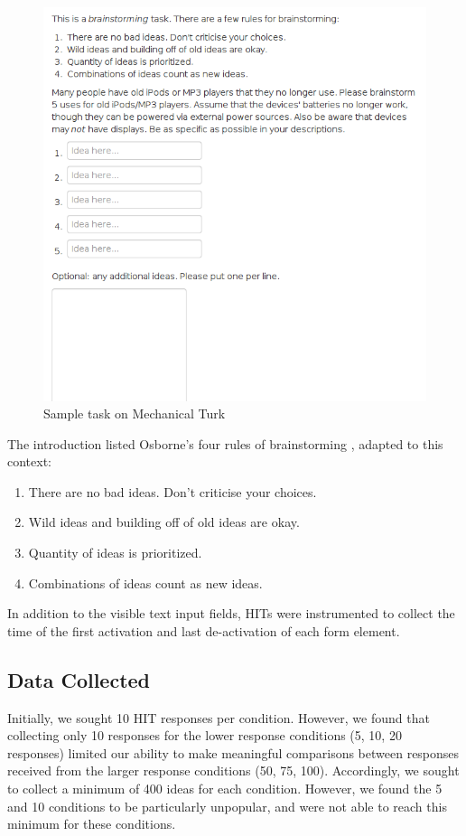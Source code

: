 \begin{figure}[h!]
    \centering
    \includegraphics[width=0.9\columnwidth]{sample_task}
    \caption{Sample task on Mechanical Turk}
    \label{fig:sample_task}
\end{figure}

The introduction listed Osborne's four rules of brainstorming \cite{osborn_applied_1957}, adapted to this context:

\begin{enumerate}
\item There are no bad ideas. Don't criticise your choices.
\item Wild ideas and building off of old ideas are okay.
\item Quantity of ideas is prioritized.
\item Combinations of ideas count as new ideas.
\end{enumerate}

In addition to the visible text input fields, HITs were instrumented to collect the time of the first activation and last de-activation of each form element.

\subsection{Data Collected}

Initially, we sought 10 HIT responses per condition. However, we found that collecting only 10 responses for the lower response conditions (5, 10, 20 responses) limited our ability to make meaningful comparisons between responses received from the larger response conditions (50, 75, 100). Accordingly, we sought to collect a minimum of 400 ideas for each condition. However, we found the 5 and 10 conditions to be particularly unpopular, and were not able to reach this minimum for these conditions.

